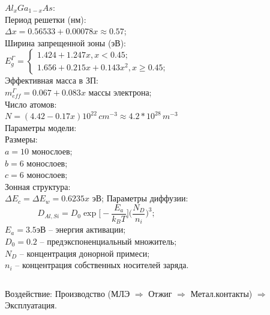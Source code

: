 \documentclass[10pt,pdf,hyperref={unicode},aspectratio={169}]{beamer}
\begin{document}
\begin{frame}
	\begin{columns}
		{\color{blue} $Al_{x}Ga_{1-x}As$:}\\
		{\color{red}\footnotesize Период решетки (нм):}\\
		\scriptsize
			$\Delta x = 0.56533+0.00078x \approx 0.57$;\\
		{\color{red}\footnotesize Ширина запрещенной зоны (эВ):}\\
		\scriptsize
			$E_{g}^{\Gamma} = \begin{cases}
				1.424+1.247x, x < 0.45;\\
				1.656+0.215x+0.143x^{2}, x \geq 0.45;
			\end{cases}$\\
		{\color{red}\footnotesize Эффективная масса в ЗП:}\\
		\scriptsize
			$m_{eff}^{\Gamma} = 0.067+0.083x$ массы электрона;\\
		{\color{red}\footnotesize Число атомов:}\\
		\scriptsize
			$N = (4.42-0.17x)10^{22}\,cm^{-3} \approx 4.2*10^{28}\,m^{-3}$\\
		{\color{blue} Параметры модели:}\\
		{\color{red}\footnotesize Размеры:}\\
		\scriptsize
			$a = 10$ монослоев;\\
			$b = 6$ монослоев;\\
			$c = 6$ монослоев;\\
		{\color{red}\footnotesize Зонная структура:}\\
			$\Delta E_{c} = \Delta E_{w} = 0.6235x$ эВ;
		{\color{blue} Параметры диффузии:}
		\scriptsize
		\begin{equation*}
			D_{Al,Si} = D_{0}\exp\bigg[-\frac{E_{a}}{k_{B}T}\bigg]\Big( \frac{N_{D}}{n_{i}} \Big)^{3};
		\end{equation*}
		$E_{a} = 3.5$эВ -- энергия активации;\\
		$D_{0} = 0.2$ -- предэкспоненциальный множитель;\\
		$N_{D}$ -- концентрация донорной примеси;\\
		$n_{i}$ -- концентрация собственных носителей заряда.
	\end{columns}
	{\color{blue}Воздействие:} {\color{red}Производство} (МЛЭ $\Rightarrow$ Отжиг $\Rightarrow$ Метал.контакты)  $\Rightarrow$ {\color{blue}Эксплуатация}.
\end{frame}
\end{document}
